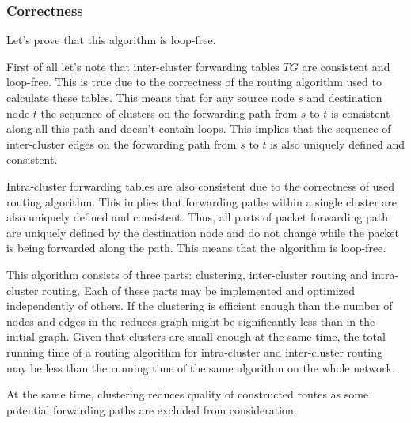 \subsubsection{Correctness}

Let's prove that this algorithm is loop-free.

First of all let's note that inter-cluster forwarding tables $TG$ are consistent and loop-free. This is true due to the correctness of the routing algorithm used to calculate these tables. This means that for any source node $s$ and destination node $t$ the sequence of clusters on the forwarding path from $s$ to $t$ is consistent along all this path and doesn't contain loops. This implies that the sequence of inter-cluster edges on the forwarding path from $s$ to $t$ is also uniquely defined and consistent.

Intra-cluster forwarding tables are also consistent due to the correctness of used routing algorithm. This implies that forwarding paths within a single cluster are also uniquely defined and consistent. Thus, all parts of packet forwarding path are uniquely defined by the destination node and do not change while the packet is being forwarded along the path. This means that the algorithm is loop-free.

This algorithm consists of three parts: clustering, inter-cluster routing and intra-cluster routing. Each of these parts may be implemented and optimized independently of others. If the clustering is efficient enough than the number of nodes and edges in the reduces graph might be significantly less than in the initial graph. Given that clusters are small enough at the same time, the total running time of a routing algorithm for intra-cluster and inter-cluster routing may be less than the running time of the same algorithm on the whole network.

At the same time, clustering reduces quality of constructed routes as some potential forwarding paths are excluded from consideration.
